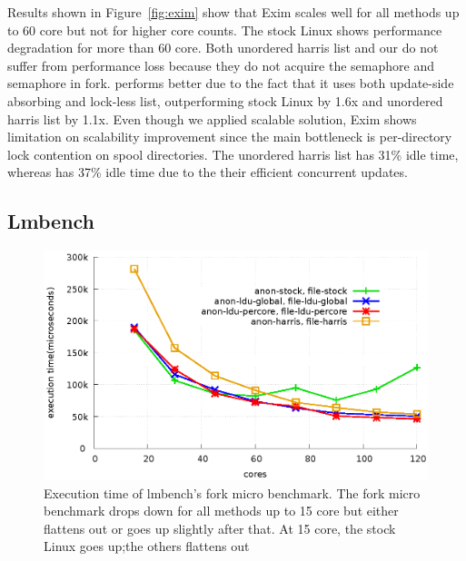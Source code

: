 \ifkor
Results shown in Figure~\ref{fig:exim} show that Exim scales well for all
methods up to 60 core but not for higher core counts.
The stock Linux shows performance degradation for more than 60 core.
Both unordered harris list
and our  do not suffer from performance loss 
because they do not acquire the 
semaphore and  semaphore in fork.
 performs better due to the fact that it uses both update-side
absorbing and lock-less list, outperforming stock Linux by 1.6x and unordered
harris list by 1.1x.
Even though we applied scalable solution, Exim shows limitation on scalability
improvement
since the main bottleneck is per-directory lock contention on spool
directories.
The unordered harris list has 31\% idle time, whereas  has 37\% idle
time due to the their efficient concurrent updates.
\else
\fi



\subsection{Lmbench}


\begin{figure}[tb]
  \begin{center}
    \includegraphics[scale=0.65]{graph/lmbench.eps}
  \end{center}
  \caption{Execution time of lmbench's fork micro benchmark. The fork micro
  benchmark drops down for all methods up to 15 core but either flattens out or
  goes up slightly after that. At 15 core, the stock Linux goes up;the others
  flattens out}
  \label{fig:MicroBench}
\end{figure}

